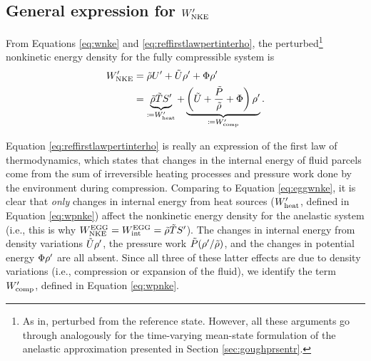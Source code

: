 \documentclass[12pt]{article}
\newcommand{\wpnke}{W^\prime_{\rm NKE}}
\newcommand{\wpheat}{W^\prime_{\rm heat}}
\newcommand{\wpcomp}{W^\prime_{\rm comp}}
\newcommand{\eggwnke}{W^{\rm EGG}_{\rm NKE}}
\newcommand{\eggwint}{W^{\rm EGG}_{\rm int}}
\begin{document}
\subsection{General expression for $\wpnke$}
From Equations \eqref{eq:wnke} and \eqref{eq:reffirstlawpertinterho}, the perturbed\footnote{As in, perturbed from the reference state. However, all these arguments go through analogously for the time-varying mean-state formulation of the anelastic approximation presented in Section \ref{sec:goughprsentr}.}  nonkinetic energy density for the fully compressible system is 
\begin{align}\label{eq:wpnke}
	\wpnke &=  \rhotilde U^\prime + \tilde{U}\rhoprime + \Phi \rhoprime \nonumber\\
	&= \underbrace{\rhotilde\tmptilde \entrprime}_{\define\wpheat} + \underbrace{\left(\tilde{U}+\frac{\tilde{P}}{\rhotilde}+\Phi\right)\rhoprime}_{\define\wpcomp}.
\end{align}

Equation \eqref{eq:reffirstlawpertinterho} is really an expression of the first law of thermodynamics, which states that changes in the internal energy of fluid parcels come from the sum of irreversible heating processes and pressure work done by the environment during compression. Comparing to Equation \eqref{eq:eggwnke}, it is clear that \textit{only} changes in internal energy from heat sources ($\wpheat$, defined in Equation \eqref{eq:wpnke}) affect the nonkinetic energy density for the anelastic system (i.e., this is why $\eggwnke=\eggwint=\rhotilde\tmptilde\entrprime$). The changes in internal energy from density variations $\tilde{U}{\rho^\prime}$, the pressure work $\tilde{P}({\rho^\prime}/\tilde{\rho})$, and the changes in potential energy $\Phi{\rho^\prime}$ are all absent. Since all three of these latter effects are due to density variations (i.e., compression or expansion of the fluid), we identify the term $\wpcomp$, defined in Equation \eqref{eq:wpnke}. %
\end{document}
